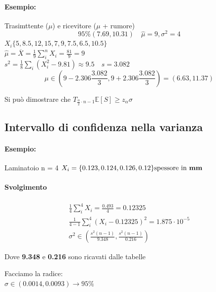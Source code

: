 \documentclass[]{article}
\newcommand{\ev}{\mathbb{E}[X]}
\renewcommand{\ev}[1]{\mathbb{E}\left[#1\right]}
\begin{document}
    \paragraph{Esempio:} Trasimttente ($\mu$) e ricevitore ($\mu$ + rumore)
    \[ 95\% (7.69, 10.31) \quad \hat{\mu} = 9, \sigma^2 = 4 \]
    $X_i \{ 5, 8.5, 12, 15, 7, 9, 7.5, 6.5, 10.5 \}$ \\
    $\hat{\mu} = \overline{X} = \frac{1}{9} \sum_{i}^{n} X_i = \frac{81}{9} = 9$ \\
    $s^2 = \frac{1}{8}\sum_{i}^{}(X_i^2-9.81) \approx 9.5 \quad s = 3.082$
    \[ \mu \in (9-2.306 \frac{3.082}{3}, 9 + 2.306 \frac{3.082}{3}) = (6.63, 11.37) \]
    \centerline{Si può dimostrare che $T_{\frac{\alpha}{2} \cdot n - 1} \ev{S} \geq z_\alpha\sigma$}

    \subsection{Intervallo di confidenza nella varianza}
    \paragraph{Esempio:} Laminatoio n = 4
    $X_i = \{ 0.123, 0.124, 0.126, 0.12 \} \text{spessore in \textbf{mm}}$ \\
    \paragraph{Svolgimento}
    \begin{equation*}
        \begin{aligned}
            \frac{1}{4} \sum_{i}^{4} X_i = \frac{0.493}{4} = 0.12325 \\
            \frac{1}{4-1} \sum_{i}^{4}\left ( X_i - 0.12325 \right )^2 = 1.875 \cdot 10^{-5} \\
            \sigma^2 \in \left ( \frac{s^2(n-1)}{9.348}, \frac{s^2(n-1)}{0.216} \right )
        \end{aligned} 
    \end{equation*}
    \centerline{Dove \textbf{9.348} e \textbf{0.216} sono ricavati dalle tabelle}
    Facciamo la radice: \\
    $\sigma \in (0.0014, 0.0093) \rightarrow 95\% $
\end{document}
